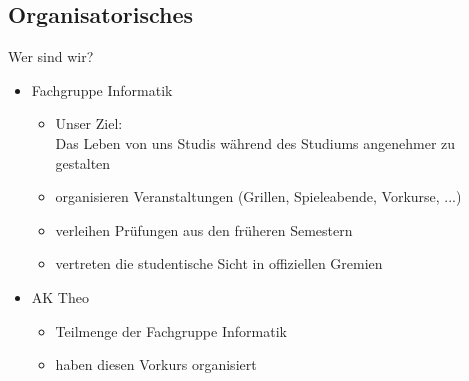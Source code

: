 \subsection{Organisatorisches}
\begin{frame}[fragile]{Wer sind wir?}
    \begin{itemize}
        \item 
            Fachgruppe Informatik
            \begin{itemize}
                \item Unser Ziel: \\
                Das Leben von uns Studis während des Studiums angenehmer zu gestalten
                \item organisieren Veranstaltungen (Grillen, Spieleabende, Vorkurse, ...)
                \item verleihen Prüfungen aus den früheren Semestern
                \item vertreten die studentische Sicht in offiziellen Gremien
            \end{itemize}
        \item AK Theo
        \begin{itemize}
            \item Teilmenge der Fachgruppe Informatik
            \item haben diesen Vorkurs organisiert
        \end{itemize}
    \end{itemize}
\end{frame}


